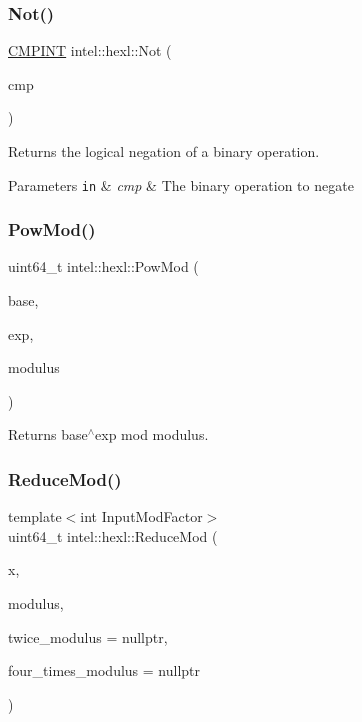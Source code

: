 \subsubsection{\texorpdfstring{Not()}{Not()}}
{\footnotesize\ttfamily \hyperlink{namespaceintel_1_1hexl_abdcc9d2d5bb10fa95d5f143874508006}{C\+M\+P\+I\+NT} intel\+::hexl\+::\+Not (\begin{DoxyParamCaption}\item[{\hyperlink{namespaceintel_1_1hexl_abdcc9d2d5bb10fa95d5f143874508006}{C\+M\+P\+I\+NT}}]{cmp }\end{DoxyParamCaption})\hspace{0.3cm}{\ttfamily [inline]}}



Returns the logical negation of a binary operation. 


\begin{DoxyParams}[1]{Parameters}
\mbox{\tt in}  & {\em cmp} & The binary operation to negate \\
\hline
\end{DoxyParams}
\mbox{\label{namespaceintel_1_1hexl_aff7287aeef7fdb27e6ffb254adb40477}} 
\subsubsection{\texorpdfstring{Pow\+Mod()}{PowMod()}}
{\footnotesize\ttfamily uint64\+\_\+t intel\+::hexl\+::\+Pow\+Mod (\begin{DoxyParamCaption}\item[{uint64\+\_\+t}]{base,  }\item[{uint64\+\_\+t}]{exp,  }\item[{uint64\+\_\+t}]{modulus }\end{DoxyParamCaption})}



Returns base$^\wedge$exp mod modulus. 

\mbox{\label{namespaceintel_1_1hexl_ab716e0395cbfe58e76f866a9044f2a62}} 
\subsubsection{\texorpdfstring{Reduce\+Mod()}{ReduceMod()}}
{\footnotesize\ttfamily template$<$int Input\+Mod\+Factor$>$ \\
uint64\+\_\+t intel\+::hexl\+::\+Reduce\+Mod (\begin{DoxyParamCaption}\item[{uint64\+\_\+t}]{x,  }\item[{uint64\+\_\+t}]{modulus,  }\item[{const uint64\+\_\+t $\ast$}]{twice\+\_\+modulus = {\ttfamily nullptr},  }\item[{const uint64\+\_\+t $\ast$}]{four\+\_\+times\+\_\+modulus = {\ttfamily nullptr} }\end{DoxyParamCaption})}



